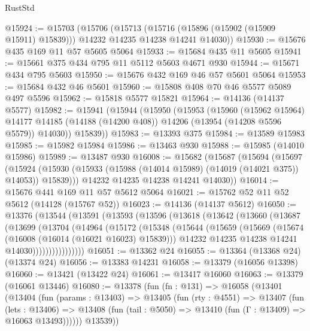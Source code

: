 \begin{lexlean}{RustStd}
\begin{coremodule}
@15924 := @15703
    (@15706
      (@15713 (@15716 (@15896 (@15902 (@15909 @15911) @15839))) @14232 @14235 @14238 @14241 @14030))
@15930 := @15676 @435 @169 @11 @57 @5605 @5064
@15933 := @15684 @435 @11 @5605
@15941 := @15661 @375 @434 @795 @11 @5112 @5603 @4671 @930
@15944 := @15671 @434 @795 @5603
@15950 := @15676 @432 @169 @46 @57 @5601 @5064
@15953 := @15684 @432 @46 @5601
@15960 := @15808 @408 @70 @46 @5577 @5089 @497 @5596
@15962 := @15818 @5577 @15821
@15964 := @14136 (@14137 @5577)
@15982 := @15941
    (@15944
      (@15950
        (@15953
          (@15960
            (@15962 @15964)
            @14177
            @14185
            (@14188 (@14200 @408))
            @14206
            (@13954 (@14208 @5596 @5579))
            @14030))
        @15839))
@15983 := @13393 @375
@15984 := @13589 @15983
@15985 := @15982 @15984
@15986 := @13463 @930
@15988 := @15985 (@14010 @15986)
@15989 := @13487 @930
@16008 := @15682
    (@15687
      (@15694
        (@15697
          (@15924 (@15930 (@15933 (@15988 (@14014 @15989) (@14019 (@14021 @375)) @14053)) @15839)))
        @14232
        @14235
        @14238
        @14241
        @14030))
@16014 := @15676 @441 @169 @11 @57 @5612 @5064
@16021 := @15762 @52 @11 @52 @5612 (@14128 (@15767 @52))
@16023 := @14136 (@14137 @5612)
@16050 := @13376
    (@13544
      (@13591
        (@13593
          (@13596
            (@13618
              (@13642
                (@13660
                  (@13687
                    (@13699
                      (@13704
                        (@14964
                          (@15172
                            (@15348
                              (@15644
                                (@15659
                                  (@15669
                                    (@15674 (@16008 (@16014 (@16021 @16023) @15839)))
                                    @14232
                                    @14235
                                    @14238
                                    @14241
                                    @14030))))))))))))))))
@16051 := @13362 @24
@16055 := @13364 (@13368 @24) (@13374 @24)
@16056 := @13383 @14231
@16058 := @13379 (@16056 @13398)
@16060 := @13421 (@13422 @24)
@16061 := @13417 @16060
@16063 := @13379 (@16061 @13446)
@16080 := @13378
    (fun (fn : @131) =>
    @16058
      (@13401
        (@13404
          (fun (params : @13403) =>
          @13405
            (fun (rty : @4551) =>
            @13407
              (fun (lets : @13406) =>
              @13408 (fun (tail : @5050) => @13410 (fun (Γ : @13409) => @16063 @13493))))))
        @13539))

\end{coremodule}
\end{lexlean}
